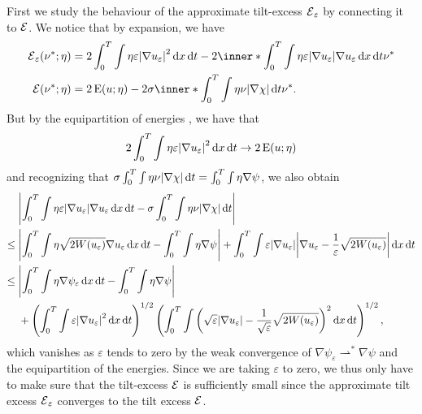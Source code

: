 First we study the behaviour of the approximate tilt-excess $ \tilt_excess_{ 
\varepsilon } $ by connecting it to $ \tilt_excess $. We notice that by 
expansion, we have
\begin{align*}
	\tilt_excess_{ \varepsilon } ( \nu^{ \ast } ; \eta )
	& =
	2
	\int_{ 0 }^{ T }
	\int
	\eta
	\varepsilon 
	\abs{ \nabla u_{ \varepsilon } }^{ 2 }
	\dd{ x }
	\dd{ t }
	-
	2 
	\inner*{\int_{ 0 }^{ T }
		\int
		\eta
		\varepsilon
		\abs{ \nabla u_{ \varepsilon } }
		\nabla u_{ \varepsilon }
		\dd{ x }
		\dd{ t } }
	{ \nu^{ \ast } }
	\\
	\tilt_excess ( \nu^{ \ast } ; \eta )
	& =
	2 \energy ( u ; \eta )
	-
	2 \sigma
	\inner*{
		\int_{ 0 }^{ T }
		\int
		\eta
		\nu 
		\abs{ \nabla \chi }
		\dd{ t }
	}{ \nu^{ \ast } }.
\end{align*}
But by the equipartition of energies , we have 
that
\begin{equation*}
	2 \int_{ 0 }^{ T }
	\int
	\eta \varepsilon 
	\abs{ \nabla u_{ \varepsilon } }^{ 2 }
	\dd{ x }
	\dd{ t }
	\to 
	2 \operatorname{E} ( u ; \eta )
\end{equation*} 
and recognizing that $ \sigma \int_{0 }^{ T } \int \eta \nu \abs{ \nabla \chi } 
\dd{ t } = \int_{ 0 }^{ T } \int \eta \nabla \psi $, we also obtain
\begin{align*}
	& 
	\abs{ 
		\int_{ 0 }^{ T }
		\int
		\eta
		\varepsilon
		\abs{ \nabla u_{ \varepsilon } }
		\nabla u_{ \varepsilon }
		\dd{ x }
		\dd{ t }
		-
		\sigma
		\int_{ 0 }^{ T }
		\int
		\eta
		\nu 
		\abs{ \nabla \chi }
		\dd{ t }
	}
	\\
	\leq {} &
	\abs{
		\int_{ 0 }^{ T }
		\int	
		\eta
		\sqrt{ 2 W ( u_{ \varepsilon } ) }
		\nabla u_{ \varepsilon }
		\dd{ x }
		\dd{ t }
		-
		\int_{ 0 }^{ T }
		\int
		\eta
		\nabla \psi
	}
	+
	\int_{ 0 }^{ T }
	\int
	\varepsilon
	\abs{ \nabla u_{ \varepsilon } }
	\abs{ \nabla u_{ \varepsilon } - \frac{ 1 }{ \varepsilon } \sqrt{ 2 W ( u_{ 
	\varepsilon } ) } }
	\dd{ x }
	\dd{ t }
	\\
	\leq {} &
	\abs{
		\int_{ 0 }^{ T }
		\int
		\eta
		\nabla \psi_{ \varepsilon } 
		\dd{ x }
		\dd{ t }
		-
		\int_{ 0 }^{ T }
		\int
		\eta
		\nabla \psi 
	}
	\\
	& +
	\left(
	\int_{ 0 }^{ T }
	\int
	\varepsilon \abs{ \nabla u_{ \varepsilon } }^{ 2 }
	\dd{ x }
	\dd{ t }
	\right)^{ 1/2 }
	\left(
	\int_{ 0 }^{ T }
	\int
	\left(
	\sqrt{ \varepsilon }
	\abs{ \nabla u_{ \varepsilon } }
	-
	\frac{ 1 }{ \sqrt{ \varepsilon } }
	\sqrt{ 2 W ( u_{ \varepsilon } ) }
	\right)^{ 2 }
	\dd{ x }
	\dd{ t }
	\right)^{ 1/2 },
\end{align*}
which vanishes as $ \varepsilon $ tends to zero by the weak convergence of $ 
\nabla \psi_{ \varepsilon } \rightharpoonup^{ \ast } \nabla \psi $ and the 
equipartition of the energies.
Since we are taking $ \varepsilon $ to zero, we thus only have to make sure 
that 
the tilt-excess $ \tilt_excess $ is sufficiently small since the approximate 
tilt excess $ \tilt_excess_{ \varepsilon } $
converges to the tilt excess $ \tilt_excess $.

